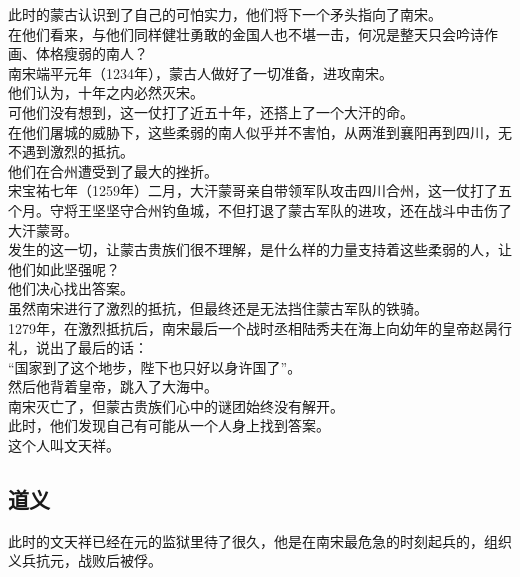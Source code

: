 \begin{multicols}{\theparacolNo}
此时的蒙古认识到了自己的可怕实力，他们将下一个矛头指向了南宋。\\

在他们看来，与他们同样健壮勇敢的金国人也不堪一击，何况是整天只会吟诗作画、体格瘦弱的南人？\\

南宋端平元年（1234年），蒙古人做好了一切准备，进攻南宋。\\

他们认为，十年之内必然灭宋。\\

可他们没有想到，这一仗打了近五十年，还搭上了一个大汗的命。\\

在他们屠城的威胁下，这些柔弱的南人似乎并不害怕，从两淮到襄阳再到四川，无不遇到激烈的抵抗。\\

他们在合州遭受到了最大的挫折。\\

宋宝祐七年（1259年）二月，大汗蒙哥亲自带领军队攻击四川合州，这一仗打了五个月。守将王坚坚守合州钓鱼城，不但打退了蒙古军队的进攻，还在战斗中击伤了大汗蒙哥。\\

发生的这一切，让蒙古贵族们很不理解，是什么样的力量支持着这些柔弱的人，让他们如此坚强呢？\\

他们决心找出答案。\\

虽然南宋进行了激烈的抵抗，但最终还是无法挡住蒙古军队的铁骑。\\

1279年，在激烈抵抗后，南宋最后一个战时丞相陆秀夫在海上向幼年的皇帝赵昺行礼，说出了最后的话：\\

“国家到了这个地步，陛下也只好以身许国了”。\\

然后他背着皇帝，跳入了大海中。\\

南宋灭亡了，但蒙古贵族们心中的谜团始终没有解开。\\

此时，他们发现自己有可能从一个人身上找到答案。\\

这个人叫文天祥。\\

\subsection{道义}
此时的文天祥已经在元的监狱里待了很久，他是在南宋最危急的时刻起兵的，组织义兵抗元，战败后被俘。\\


\end{multicols}
